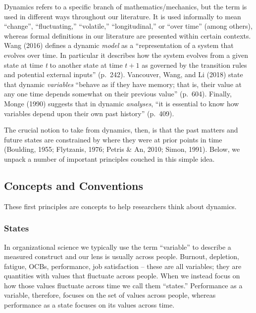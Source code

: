 \documentclass[english,,man]{apa6}
\theoremstyle{definition}
\theoremstyle{definition}
\theoremstyle{definition}
\theoremstyle{remark}
\begin{document}
Dynamics refers to a specific branch of mathematics/mechanics, but the
term is used in different ways throughout our literature. It is used
informally to mean \enquote{change}, \enquote{fluctuating,}
\enquote{volatile,} \enquote{longitudinal,} or \enquote{over time}
(among others), whereas formal definitions in our literature are
presented within certain contexts. Wang (2016) defines a dynamic
\emph{model} as a \enquote{representation of a system that evolves over
time. In particular it describes how the system evolves from a given
state at time \emph{t} to another state at time \(t + 1\) as governed by
the transition rules and potential external inputs} (p.~242). Vancouver,
Wang, and Li (2018) state that dynamic \emph{variables} \enquote{behave
as if they have memory; that is, their value at any one time depends
somewhat on their previous value} (p.~604). Finally, Monge (1990)
suggests that in dynamic \emph{analyses}, \enquote{it is essential to
know how variables depend upon their own past history} (p.~409).

The crucial notion to take from dynamics, then, is that the past matters
and future states are constrained by where they were at prior points in
time (Boulding, 1955; Flytzanis, 1976; Petris \& An, 2010; Simon, 1991).
Below, we unpack a number of important principles couched in this simple
idea.

\hypertarget{concepts-and-conventions}{%
\subsection{Concepts and Conventions}\label{concepts-and-conventions}}

These first principles are concepts to help researchers think about
dynamics.

\hypertarget{states}{%
\subsubsection{States}\label{states}}

In organizational science we typically use the term \enquote{variable}
to describe a measured construct and our lens is usually across people.
Burnout, depletion, fatigue, OCBs, performance, job satisfaction --
these are all variables; they are quantities with values that fluctuate
across people. When we instead focus on how those values fluctuate
across time we call them \enquote{states.} Performance as a variable,
therefore, focuses on the set of values across people, whereas
performance as a state focuses on its values across time.
\end{document}
